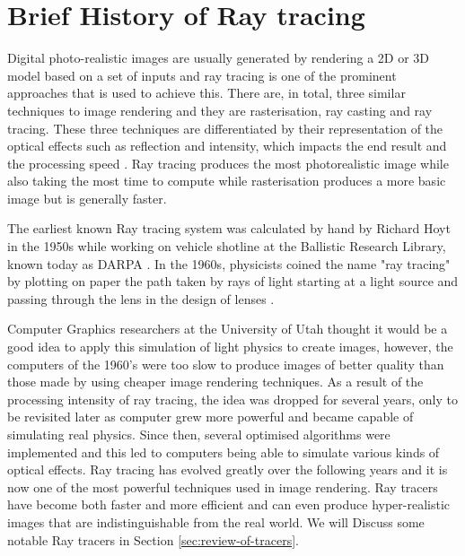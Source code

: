 \documentclass[a4paper]{report}
\begin{document}
	\section{Brief History of Ray tracing}
	
	\par Digital photo-realistic images are usually generated by rendering a 2D or 3D model based on a set of inputs and ray tracing is one of the prominent approaches that is used to achieve this. There are, in total, three similar techniques to image rendering and they are rasterisation, ray casting and ray tracing. These three techniques are differentiated by their representation of the optical effects such as reflection and intensity, which impacts the end result and the processing speed \cite{wald_interactive_2001}. Ray tracing produces the most photorealistic image while also taking the most time to compute while rasterisation produces a more basic image but is generally faster.\newline
	
	\par The earliest known Ray tracing system was calculated by hand by Richard Hoyt in the 1950s while working on vehicle shotline at the Ballistic Research Library, known today as DARPA \cite{klopcic_historical_1999}. In the 1960s, physicists coined the name "ray tracing" by plotting on paper the path taken by rays of light starting at a light source and passing through the lens in the design of lenses \cite{glassner_introduction_1989}.\newline
	
	\par Computer Graphics researchers at the University of Utah thought it would be a good idea to apply this simulation of light physics to create images, however, the computers of the 1960's were too slow to produce images of better quality than those made by using cheaper image rendering techniques. As a result of the processing intensity of ray tracing, the idea was dropped for several years, only to be revisited later as computer grew more powerful and became capable of simulating real physics\cite{weghorst_improved_1984}. Since then, several optimised algorithms were implemented and this led to computers being able to simulate various kinds of optical effects. Ray tracing has evolved greatly over the following years and it is now one of the most powerful techniques used in image rendering. Ray tracers have become both faster and more efficient and can even produce hyper-realistic images that are indistinguishable from the real world. We will Discuss some notable Ray tracers in Section \ref{sec:review-of-tracers}.\newline
	
\end{document}
